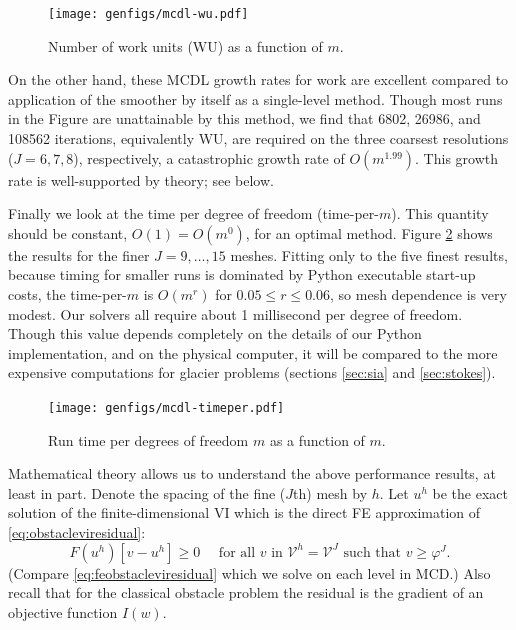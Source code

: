 \documentclass[letterpaper,final,12pt,reqno]{amsart}
\theoremstyle{claim}
\numberwithin{equation}{section}
\numberwithin{figure}{section}
\numberwithin{table}{section}
\numberwithin{theorem}{section}
\begin{document}
\begin{figure}
\texttt{[image: genfigs/mcdl-wu.pdf]}
\caption{Number of work units (WU) as a function of $m$.}
\label{fig:mcdl-wu}
\end{figure}

On the other hand, these MCDL growth rates for work are excellent compared to application of the smoother by itself as a single-level method.  Though most runs in the Figure are unattainable by this method, we find that 6802, 26986, and 108562 iterations, equivalently WU, are required on the three coarsest resolutions ($J=6,7,8$), respectively, a catastrophic growth rate of $O(m^{1.99})$.  This growth rate is well-supported by theory; see below.

Finally we look at the time per degree of freedom (time-per-$m$).  This quantity should be constant, $O(1)=O(m^0)$, for an optimal method.  Figure \ref{fig:mcdl-timeper} shows the results for the finer $J=9,\dots,15$ meshes.  Fitting only to the five finest results, because timing for smaller runs is dominated by Python executable start-up costs, the time-per-$m$ is $O(m^r)$ for $0.05 \le r \le 0.06$, so mesh dependence is very modest.  Our solvers all require about 1 millisecond per degree of freedom.  Though this value depends completely on the details of our Python implementation, and on the physical computer, it will be compared to the more expensive computations for glacier problems (sections \ref{sec:sia} and \ref{sec:stokes}).

\begin{figure}
\texttt{[image: genfigs/mcdl-timeper.pdf]}
\caption{Run time per degrees of freedom $m$ as a function of $m$.}
\label{fig:mcdl-timeper}
\end{figure}

Mathematical theory allows us to understand the above performance results, at least in part.   Denote the spacing of the fine ($J$th) mesh by $h$.  Let $u^h$ be the exact solution of the finite-dimensional VI which is the direct FE approximation of \eqref{eq:obstacleviresidual}:
\begin{equation}
  F(u^h)[v-u^h] \ge 0 \quad \text{ for all } v \text{ in $\mathcal{V}^h=\mathcal{V}^J$ such that } v \ge \varphi^J. \label{eq:feobstaclevioriginal}
\end{equation}
(Compare \eqref{eq:feobstacleviresidual} which we solve on each level in MCD.)  Also recall that for the classical obstacle problem the residual is the gradient of an objective function $I(w)$.
\end{document}

